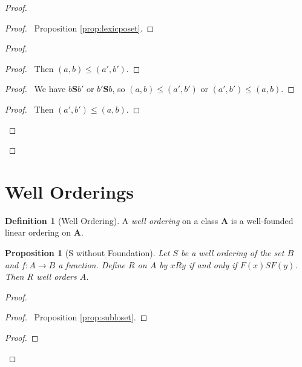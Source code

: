 \documentclass{book}
\let\qed\relax
\newtheorem{prop}[ax]{Proposition}
\theoremstyle{definition}
\newtheorem{df}[ax]{Definition}
\begin{document}
\begin{proof}
\pf
{}
\begin{proof}
	\pf\ Proposition \ref{prop:lexicposet}.
\end{proof}
\begin{proof}
	\begin{proof}
		\pf\ Then $(a,b) \leq (a',b')$.
	\end{proof}
	\begin{proof}
		\pf\ We have $b \mathbf{S} b'$ or $b' \mathbf{S} b$, so $(a,b) \leq (a',b')$ or $(a',b') \leq (a,b)$.
	\end{proof}
	\begin{proof}
		\pf\ Then $(a',b') \leq (a,b)$.
	\end{proof}
\end{proof}
\qed
\end{proof}

\section{Well Orderings}

\begin{df}[Well Ordering]
A \emph{well ordering} on a class $\mathbf{A}$ is a well-founded linear ordering on $\mathbf{A}$.
\end{df}

\begin{prop}[S without Foundation]
Let $S$ be a well ordering of the set $B$ and $f : A \rightarrow B$ a function. Define $R$ on $A$ by $xRy$ if and only if $F(x) S F(y)$. Then $R$ well orders $A$.
\end{prop}

\begin{proof}
\pf
{}
\begin{proof}
	\pf\ Proposition \ref{prop:subloset}.
\end{proof}
\begin{proof}
\end{proof}
\qed
\end{proof}
\end{document}
